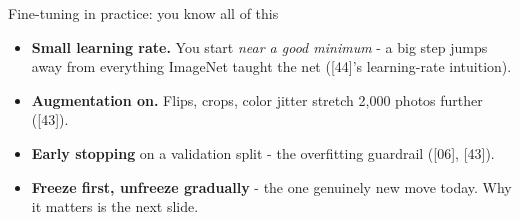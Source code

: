 \documentclass[aspectratio=169]{beamer}
\begin{document}
\begin{frame}{Fine-tuning in practice: you know all of this}
  \begin{itemize}
    \item \textbf{Small learning rate.} You start \emph{near a good minimum} - a big step
      jumps away from everything ImageNet taught the net ([44]'s learning-rate
      intuition).
    \item \textbf{Augmentation on.} Flips, crops, color jitter stretch 2,000 photos
      further ([43]).
    \item \textbf{Early stopping} on a validation split - the overfitting guardrail
      ([06], [43]).
    \item \textbf{Freeze first, unfreeze gradually} - the one genuinely new move today. Why
      it matters is the next slide.
  \end{itemize}
  \vskip 8pt
\end{frame}
\end{document}
